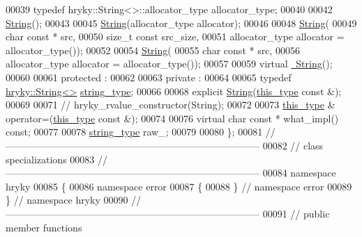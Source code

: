 \begin{DoxyCode}
00039     \textcolor{keyword}{typedef} hryky::String<>::allocator\_type     allocator\_type;
00040 
00042     \hyperlink{classhryky_1_1error_1_1_string_afd94f4070319d5cc07a85ee9f2c85e6a}{String}();
00043 
00045     \hyperlink{classhryky_1_1error_1_1_string_afd94f4070319d5cc07a85ee9f2c85e6a}{String}(allocator\_type allocator);
00046 
00048     \hyperlink{classhryky_1_1error_1_1_string_afd94f4070319d5cc07a85ee9f2c85e6a}{String}(
00049         \textcolor{keywordtype}{char} \textcolor{keyword}{const} * src,
00050         \textcolor{keywordtype}{size\_t} \textcolor{keyword}{const} src\_size,
00051         allocator\_type allocator = allocator\_type());
00052 
00054     \hyperlink{classhryky_1_1error_1_1_string_afd94f4070319d5cc07a85ee9f2c85e6a}{String}(
00055         \textcolor{keywordtype}{char} \textcolor{keyword}{const} * src,
00056         allocator\_type allocator = allocator\_type());
00057 
00059     \textcolor{keyword}{virtual} \hyperlink{classhryky_1_1error_1_1_string_a08d09aaa1e6f02645a67929656396353}{~String}();
00060 
00061 \textcolor{keyword}{protected} :
00062 
00063 \textcolor{keyword}{private} :
00064 
00065     \textcolor{keyword}{typedef} \hyperlink{classhryky_1_1_string}{hryky::String<>} \hyperlink{classhryky_1_1_string}{string_type};
00066 
00068     \textcolor{keyword}{explicit} \hyperlink{classhryky_1_1error_1_1_string_afd94f4070319d5cc07a85ee9f2c85e6a}{String}(\hyperlink{classhryky_1_1error_1_1_base}{this_type} \textcolor{keyword}{const} &);
00069 
00071     \textcolor{comment}{// hryky\_rvalue\_constructor(String);}
00072 
00073     \hyperlink{classhryky_1_1error_1_1_base}{this_type} & operator=(\hyperlink{classhryky_1_1error_1_1_base}{this_type} \textcolor{keyword}{const} &);
00074 
00076     \textcolor{keyword}{virtual} \textcolor{keywordtype}{char} \textcolor{keyword}{const} * what\_impl() \textcolor{keyword}{const};
00077 
00078     \hyperlink{classhryky_1_1_string}{string_type} raw\_;
00079 
00080 \};
00081 \textcolor{comment}{//
      ------------------------------------------------------------------------------}
00082 \textcolor{comment}{// class specializations}
00083 \textcolor{comment}{//
      ------------------------------------------------------------------------------}
00084 \textcolor{keyword}{namespace }hryky
00085 \{
00086 \textcolor{keyword}{namespace }error
00087 \{
00088 \} \textcolor{comment}{// namespace error}
00089 \} \textcolor{comment}{// namespace hryky}
00090 \textcolor{comment}{//
      ------------------------------------------------------------------------------}
00091 \textcolor{comment}{// public member functions}

\end{DoxyCode}

